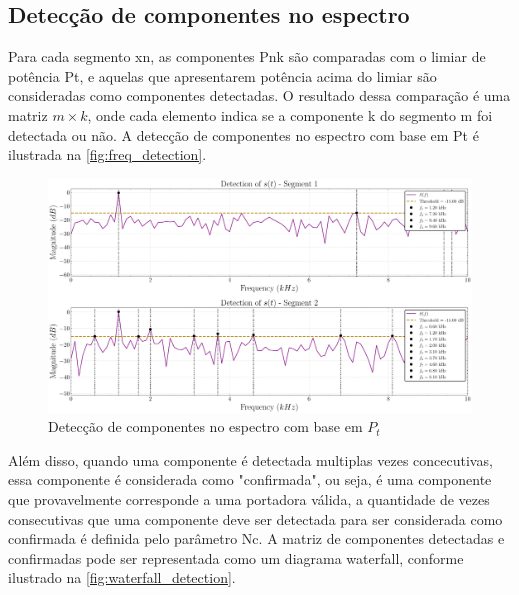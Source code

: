 \subsection{Detecção de componentes no espectro}\label{sec:comparacao_potencia}

Para cada segmento \gls{xn}, as componentes \gls{Pnk} são comparadas com o limiar de potência \gls{Pt}, e aquelas que apresentarem potência acima do limiar são consideradas como componentes detectadas. O resultado dessa comparação é uma matriz $m \times k$, onde cada elemento indica se a componente \gls{k} do segmento \gls{m} foi detectada ou não. A detecção de componentes no espectro com base em \gls{Pt} é ilustrada na \autoref{fig:freq_detection}.

\begin{figure}[H]
	\centering
	\caption{Detecção de componentes no espectro com base em $P_t$}\label{fig:freq_detection}
	\includegraphics[width=\linewidth]{assets/cap3/example_detector_freq.pdf}
\end{figure}

Além disso, quando uma componente é detectada multiplas vezes concecutivas, essa componente é considerada como "confirmada", ou seja, é uma componente que provavelmente corresponde a uma portadora válida, a quantidade de vezes consecutivas que uma componente deve ser detectada para ser considerada como confirmada é definida pelo parâmetro \gls{Nc}. A matriz de componentes detectadas e confirmadas pode ser representada como um diagrama waterfall, conforme ilustrado na \autoref{fig:waterfall_detection}.

